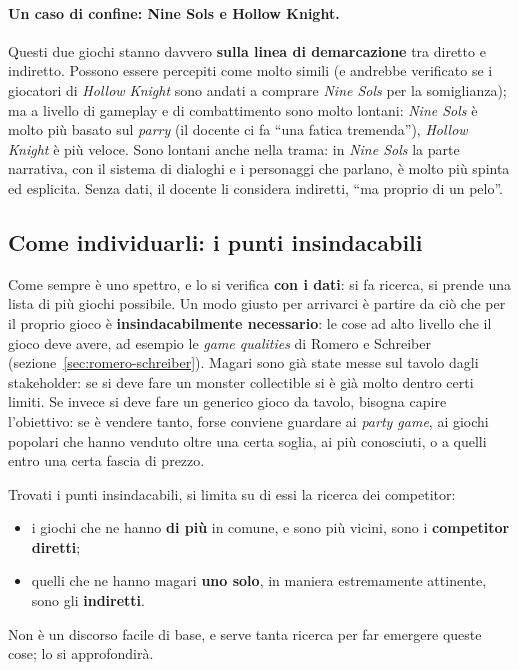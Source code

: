 \paragraph{Un caso di confine: Nine Sols e Hollow Knight.} Questi due giochi
stanno davvero \textbf{sulla linea di demarcazione} tra diretto e indiretto.
Possono essere percepiti come molto simili (e andrebbe verificato se i
giocatori di \emph{Hollow Knight} sono andati a comprare \emph{Nine Sols} per
la somiglianza); ma a livello di gameplay e di combattimento sono molto
lontani: \emph{Nine Sols} è molto più basato sul \emph{parry} (il docente ci
fa ``una fatica tremenda''), \emph{Hollow Knight} è più veloce. Sono lontani
anche nella trama: in \emph{Nine Sols} la parte narrativa, con il sistema di
dialoghi e i personaggi che parlano, è molto più spinta ed esplicita. Senza
dati, il docente li considera indiretti, ``ma proprio di un pelo''.

\subsection{Come individuarli: i punti insindacabili}

Come sempre è uno spettro, e lo si verifica \textbf{con i dati}: si fa
ricerca, si prende una lista di più giochi possibile. Un modo giusto per
arrivarci è partire da ciò che per il proprio gioco è
\textbf{insindacabilmente necessario}: le cose ad alto livello che il gioco
deve avere, ad esempio le \emph{game qualities} di Romero e Schreiber
(sezione~\ref{sec:romero-schreiber}). Magari sono già state messe sul tavolo
dagli stakeholder: se si deve fare un monster collectible si è già molto
dentro certi limiti. Se invece si deve fare un generico gioco da tavolo, bisogna
capire l'obiettivo: se è vendere tanto, forse conviene guardare ai
\emph{party game}, ai giochi popolari che hanno venduto oltre una certa soglia,
ai più conosciuti, o a quelli entro una certa fascia di prezzo.

Trovati i punti insindacabili, si limita su di essi la ricerca dei
competitor:
\begin{itemize}
  \item i giochi che ne hanno \textbf{di più} in comune, e sono più vicini, sono
        i \textbf{competitor diretti};
  \item quelli che ne hanno magari \textbf{uno solo}, in maniera estremamente
        attinente, sono gli \textbf{indiretti}.
\end{itemize}
Non è un discorso facile di base, e serve tanta ricerca per far emergere
queste cose; lo si approfondirà.


